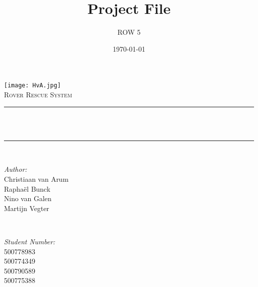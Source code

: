\title{Project File}
\author{ROW 5}
\date{\today}

\makeatletter
\let\thetitle\@title
\let\theauthor\@author
\let\thedate\@date
\makeatother

\pagestyle{fancy}
\fancyhf{}
\rhead{\theauthor}
\lhead{\thetitle}
\cfoot{\thepage}

\begin{titlepage}
	\centering
	\vspace*{0.5 cm}
	\texttt{[image: HvA.jpg]}\\[1.0 cm]
	\textsc{\Large Rover Rescue System}\\[0.5 cm]
	\rule{\linewidth}{0.2 mm} \\[0.4 cm]
	{ \huge \bfseries \thetitle}\\
	\rule{\linewidth}{0.2 mm} \\[1.5 cm]

	\begin{minipage}{0.4\textwidth}
		\begin{flushleft} \large
			\emph{Author:}\\
			Christiaan van Arum\\
			Rapha\"el Bunck\\
			Nino van Galen\\
			Martijn Vegter
		\end{flushleft}
	\end{minipage}~
	\begin{minipage}{0.4\textwidth}
		\begin{flushright} \large
			\emph{Student Number:} \\
			500778983\\ %
			500774349\\ %
			500790589\\ %
			500775388	%
		\end{flushright}
	\end{minipage}\\[2 cm]

	{\large \thedate}\\[2 cm]

	\vfill	
\end{titlepage}
